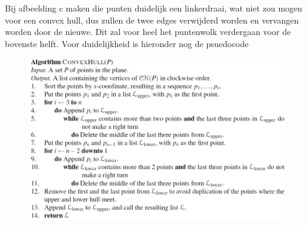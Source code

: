 \documentclass[12pt,a4paper]{article}
\begin{document}
	\begin{figure}[h]
		\centering
		\label{fig:incremental-example}
	\end{figure}
	Bij afbeelding c maken die punten duidelijk een linkerdraai, wat niet zou mogen voor een convex hull, dus zullen de twee edges verwijderd worden en vervangen worden door de nieuwe. Dit zal voor heel het puntenwolk verdergaan voor de bovenste helft. Voor duidelijkheid is hieronder nog de psuedocode
	\begin{figure}[h]
		\centering
		\includegraphics[width=0.9\linewidth]{afbeeldingen/convex-hull}
		\label{fig:convex-hull}
	\end{figure}
\end{document}
